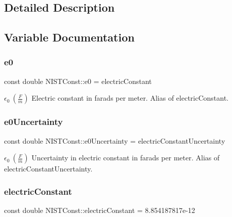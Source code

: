 \subsection{Detailed Description}


\subsection{Variable Documentation}
\mbox{\label{group___n_i_s_t_const-_electric_constant_ga6fa2aaf171b8dafe96bbd87c7aa95f59}} 
\subsubsection{\texorpdfstring{e0}{e0}}
{\footnotesize\ttfamily const double N\+I\+S\+T\+Const\+::e0 = electric\+Constant}

$\epsilon_0 \ (\frac{F}{m})$ Electric constant in farads per meter. Alias of electric\+Constant. \mbox{\label{group___n_i_s_t_const-_electric_constant_ga35084e49b0f999bcafda4ae95038913c}} 
\subsubsection{\texorpdfstring{e0\+Uncertainty}{e0Uncertainty}}
{\footnotesize\ttfamily const double N\+I\+S\+T\+Const\+::e0\+Uncertainty = electric\+Constant\+Uncertainty}

$\epsilon_0 \ (\frac{F}{m})$ Uncertainty in electric constant in farads per meter. Alias of electric\+Constant\+Uncertainty. \mbox{\label{group___n_i_s_t_const-_electric_constant_gae5a425228125285727dd53333725ef76}} 
\subsubsection{\texorpdfstring{electric\+Constant}{electricConstant}}
{\footnotesize\ttfamily const double N\+I\+S\+T\+Const\+::electric\+Constant = 8.\+854187817e-\/12}

